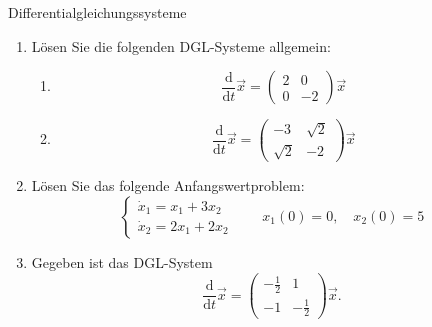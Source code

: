 \begin{ueb}{Differentialgleichungssysteme}{}

    \begin{enumerate}
        \item Lösen Sie die folgenden DGL-Systeme allgemein:

              \begin{enumerate}
                  \item
                        \[
                            \frac{\mathrm{d}}{\mathrm{d}t}\vec{x}
                            =
                            \begin{pmatrix}
                                2 & 0  \\
                                0 & -2
                            \end{pmatrix}
                            \vec{x}
                        \]

                  \item
                        \[
                            \frac{\mathrm{d}}{\mathrm{d}t}\vec{x}
                            =
                            \begin{pmatrix}
                                -3       & \sqrt{2} \\
                                \sqrt{2} & -2
                            \end{pmatrix}
                            \vec{x}
                        \]
              \end{enumerate}

        \item Lösen Sie das folgende Anfangswertproblem:
              \[
                  \begin{cases}
                      \dot{x}_1=x_1+3x_2 \\
                      \dot{x}_2=2x_1+2x_2
                  \end{cases}
                  \qquad
                  x_1(0)=0,\quad x_2(0)=5
              \]

        \item Gegeben ist das DGL-System
              \[
                  \frac{\mathrm{d}}{\mathrm{d}t}\vec{x}
                  =
                  \begin{pmatrix}
                      -\frac{1}{2} & 1            \\
                      -1           & -\frac{1}{2}
                  \end{pmatrix}
                  \vec{x}.
              \]


\end{enumerate}
\end{ueb}
